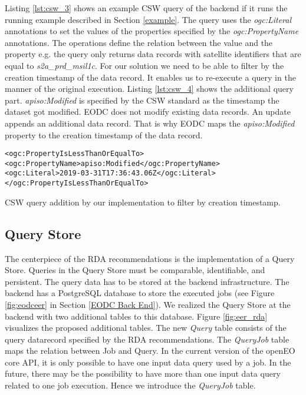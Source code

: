 \documentclass[draft,final]{vutinfth} %
\newenvironment{code}{\captionsetup{type=listing}}{}
\newcommand{\bgoesswein}[1]{{\color{blue}#1}}
\begin{document}
\bgoesswein{
Listing \ref{lst:csw_3} shows an example CSW query of the backend if it runs the running example described in Section \ref{example}. The query uses the \textit{ogc:Literal} annotations to set the values of the properties specified by the \textit{ogc:PropertyName} annotations. The operations define the relation between the value and the property e.g. the query only returns data records with satellite identifiers that are equal to \textit{s2a\_prd\_msil1c}. For our solution we need to be able to filter by the creation timestamp of the data record. It enables us to re-execute a query in the manner of the original execution. Listing \ref{lst:csw_4} shows the additional query part. \textit{apiso:Modified} is specified by the CSW standard as the timestamp the dataset got modified. EODC does not modify existing data records. An update appends an additional data record. That is why EODC maps the \textit{apiso:Modified} property to the creation timestamp of the data record.   
}

\begin{code}
	\begin{verbatim}
<ogc:PropertyIsLessThanOrEqualTo>
<ogc:PropertyName>apiso:Modified</ogc:PropertyName>
<ogc:Literal>2019-03-31T17:36:43.06Z</ogc:Literal>
</ogc:PropertyIsLessThanOrEqualTo>
	\end{verbatim}
	\caption{CSW query addition by our implementation to filter by creation timestamp.}
	\label{lst:csw_4}
\end{code} 




\subsection{Query Store}
The centerpiece of the RDA recommendations is the implementation of a Query Store. Queries in the Query Store must be comparable, identifiable, and persistent. The query data has to be stored at the backend infrastructure. The backend has a PostgreSQL database to store the executed jobs (see Figure \ref{fig:eodceer} in Section \ref{EODC Back End}). We realized the Query Store at the backend with two additional tables to this database. Figure \ref{fig:eer_rda} visualizes the proposed additional tables. The new \textit{Query} table consists of the query datarecord specified by the RDA recommendations. The \textit{QueryJob} table maps the relation between Job and Query. In the current version of the openEO core API, it is only possible to have one input data query used by a job. In the future, there may be the possibility to have more than one input data query related to one job execution. Hence we introduce the \textit{QueryJob} table. 
\end{document}
